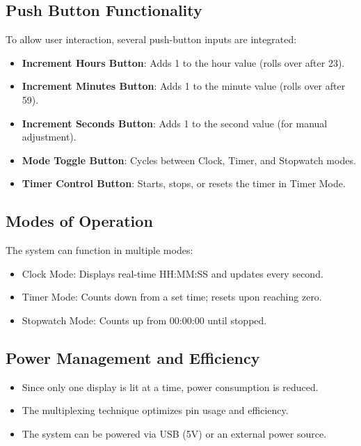 \documentclass[journal]{IEEEtran}
\begin{document}
\subsection{Push Button Functionality}

To allow user interaction, several push-button inputs are integrated:

\begin{itemize}
    \item \textbf{Increment Hours Button}: Adds 1 to the hour value (rolls over after 23).
    \item \textbf{Increment Minutes Button}: Adds 1 to the minute value (rolls over after 59).
    \item \textbf{Increment Seconds Button}: Adds 1 to the second value (for manual adjustment).
    \item \textbf{Mode Toggle Button}: Cycles between Clock, Timer, and Stopwatch modes.
    \item \textbf{Timer Control Button}: Starts, stops, or resets the timer in Timer Mode.
\end{itemize}

\subsection{Modes of Operation}

The system can function in multiple modes:


\begin{itemize}
    \item Clock Mode: Displays real-time HH:MM:SS and updates every second.
    \item Timer Mode: Counts down from a set time; resets upon reaching zero.
    \item Stopwatch Mode: Counts up from 00:00:00 until stopped.
\end{itemize}

\subsection{Power Management and Efficiency}

\begin{itemize}
    \item Since only one display is lit at a time, power consumption is reduced.
    \item The multiplexing technique optimizes pin usage and efficiency.
    \item The system can be powered via USB (5V) or an external power source.
\end{itemize}
\end{document}
